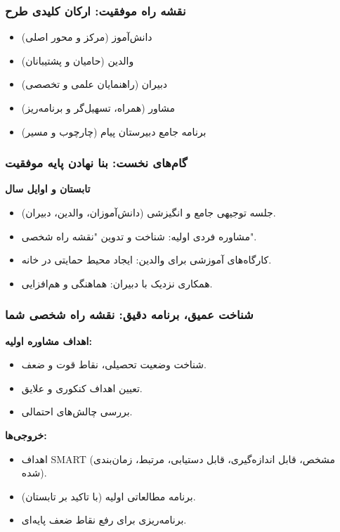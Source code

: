 \documentclass[aspectratio=169]{beamer}
\begin{document}
\begin{frame}[fragile]
  \frametitle{نقشه راه موفقیت: ارکان کلیدی طرح}
  \begin{itemize}
    \item دانش‌آموز (مرکز و محور اصلی)
    \item والدین (حامیان و پشتیبانان)
    \item دبیران (راهنمایان علمی و تخصصی)
    \item مشاور (همراه، تسهیل‌گر و برنامه‌ریز)
    \item برنامه جامع دبیرستان پیام (چارچوب و مسیر)
  \end{itemize}
\end{frame}

\begin{frame}[fragile]
  \frametitle{گام‌های نخست: بنا نهادن پایه موفقیت}
  \textbf{تابستان و اوایل سال}
  \begin{itemize}
    \item جلسه توجیهی جامع و انگیزشی (دانش‌آموزان، والدین، دبیران).
    \item مشاوره فردی اولیه: شناخت و تدوین "نقشه راه شخصی".
    \item کارگاه‌های آموزشی برای والدین: ایجاد محیط حمایتی در خانه.
    \item همکاری نزدیک با دبیران: هماهنگی و هم‌افزایی.
  \end{itemize}
\end{frame}

\begin{frame}[fragile]
  \frametitle{شناخت عمیق، برنامه دقیق: نقشه راه شخصی شما}
  \textbf{اهداف مشاوره اولیه:}
  \begin{itemize}
    \item شناخت وضعیت تحصیلی، نقاط قوت و ضعف.
    \item تعیین اهداف کنکوری و علایق.
    \item بررسی چالش‌های احتمالی.
  \end{itemize}
  \medskip
  \textbf{خروجی‌ها:}
  \begin{itemize}
    \item اهداف SMART (مشخص، قابل اندازه‌گیری، قابل دستیابی، مرتبط، زمان‌بندی شده).
    \item برنامه مطالعاتی اولیه (با تاکید بر تابستان).
    \item برنامه‌ریزی برای رفع نقاط ضعف پایه‌ای.
  \end{itemize}
\end{frame}
\end{document}
